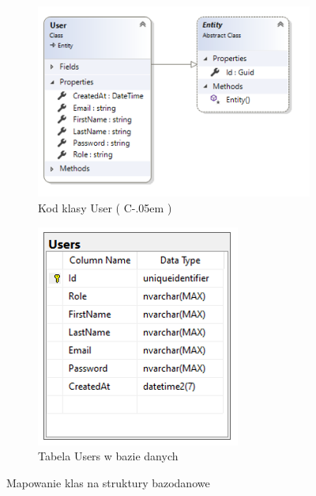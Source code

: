 \documentclass[12pt]{article}
\newcommand{\Csharp}{%
  {\settoheight{\dimen0}{C}C\kern-.05em \resizebox{!}{\dimen0}{\raisebox{\depth}{\# }}}}
\numberwithin{figure}{section}
\begin{document}
\begin{sloppypar}
\begin{figure}[H]
    \centering
    \begin{subfigure}{.6\textwidth}
      \centering
      \includegraphics[width=.9\linewidth]{images/chapter_3/ef-code.png}
      \caption{Kod klasy User (\Csharp)}
      \label{fig:ef-code}
    \end{subfigure}%
    \begin{subfigure}{.4\textwidth}
      \centering
      \includegraphics[width=.9\linewidth]{images/chapter_3/ef-db.png}
      \caption{Tabela Users w bazie danych}
      \label{fig:ef-db}
    \end{subfigure}
    \caption{Mapowanie klas na struktury bazodanowe}
    \label{fig:ef}
\end{figure}
    

\end{sloppypar}
\end{document}
